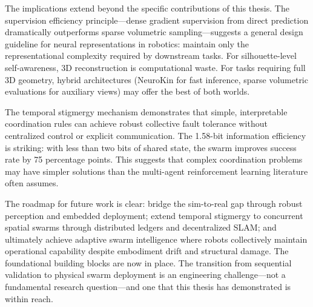 \documentclass[12pt,a4paper,oneside]{report}
\begin{document}
The implications extend beyond the specific contributions of this thesis. The supervision efficiency principle—dense gradient supervision from direct prediction dramatically outperforms sparse volumetric sampling—suggests a general design guideline for neural representations in robotics: maintain only the representational complexity required by downstream tasks. For silhouette-level self-awareness, 3D reconstruction is computational waste. For tasks requiring full 3D geometry, hybrid architectures (NeuroKin for fast inference, sparse volumetric evaluations for auxiliary views) may offer the best of both worlds.

The temporal stigmergy mechanism demonstrates that simple, interpretable coordination rules can achieve robust collective fault tolerance without centralized control or explicit communication. The 1.58-bit information efficiency is striking: with less than two bits of shared state, the swarm improves success rate by 75 percentage points. This suggests that complex coordination problems may have simpler solutions than the multi-agent reinforcement learning literature often assumes.

The roadmap for future work is clear: bridge the sim-to-real gap through robust perception and embedded deployment; extend temporal stigmergy to concurrent spatial swarms through distributed ledgers and decentralized SLAM; and ultimately achieve adaptive swarm intelligence where robots collectively maintain operational capability despite embodiment drift and structural damage. The foundational building blocks are now in place. The transition from sequential validation to physical swarm deployment is an engineering challenge—not a fundamental research question—and one that this thesis has demonstrated is within reach.


\end{document}

